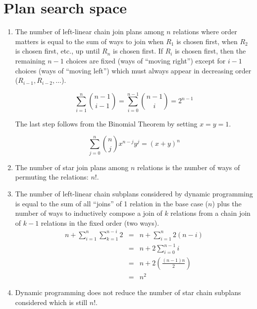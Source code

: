 \documentclass[12pt]{article}
\begin{document}
\section{Plan search space}

\begin{enumerate}
\item %
The number of left-linear chain join plans among $n$ relations where order
matters is equal to the sum of ways to join when $R_1$ is chosen
first, when $R_2$ is chosen first, etc., up until $R_n$ is chosen first.
If $R_i$ is chosen first, then the remaining $n-1$ choices are fixed
(ways of ``moving right'') except for $i-1$ choices (ways of ``moving left'')
which must always appear in decreasing order ($R_{i-1}, R_{i-2}, \ldots$).

\begin{displaymath}
\sum_{i=1}^{n} \binom{n-1}{i-1} = \sum_{i=0}^{n-1} \binom{n-1}{i} = 2^{n-1}
\end{displaymath}

The last step follows from the Binomial Theorem by setting $x=y=1$.

\begin{displaymath}
\sum_{j=0}^{n} \binom{n}{j}x^{n-j}y^j = (x+y)^n
\end{displaymath}

\item %
The number of star join plans among $n$ relations is the number of ways of
permuting the relations: $n!$.

\item %
The number of left-linear chain subplans considered by dynamic programming is
equal to the sum of all ``joins'' of 1 relation in
the base case ($n$) plus the number of ways to inductively compose a join
of $k$ relations from a chain join of $k-1$ relations in the fixed 
order (two ways).
%
\begin{eqnarray*}
n + \sum_{i=1}^n \sum_{k=1}^{n-i} 2 & = & n + \sum_{i=1}^n 2(n-i)\\
                                    & = & n + 2\sum_{i=0}^{n-1} i \\
                                    & = & n + 2(\frac{(n-1)n}{2})\\
                                    & = & n^2
\end{eqnarray*}

\item %
Dynamic programming does not reduce the number of star chain subplans
considered which is still $n!$.

\end{enumerate}
\end{document}
